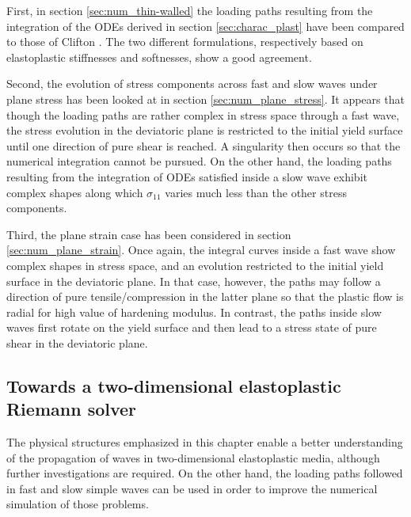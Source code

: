 First, in section \ref{sec:num_thin-walled} the loading paths resulting from the integration of the ODEs derived in section \ref{sec:charac_plast} have been compared to those of Clifton \cite{Clifton}.
The two different formulations, respectively based on elastoplastic stiffnesses and softnesses, show a good agreement.

Second, the evolution of stress components across fast and slow waves under plane stress has been looked at in section \ref{sec:num_plane_stress}.
It appears that though the loading paths are rather complex in stress space through a fast wave, the stress evolution in the deviatoric plane is restricted to the initial yield surface until one direction of pure shear is reached.
A singularity then occurs so that the numerical integration cannot be pursued.
On the other hand, the loading paths resulting from the integration of ODEs satisfied inside a slow wave exhibit complex shapes along which $\sigma_{11}$ varies much less than the other stress components.

Third, the plane strain case has been considered in section \ref{sec:num_plane_strain}.
Once again, the integral curves inside a fast wave show complex shapes in stress space, and an evolution restricted to the initial yield surface in the deviatoric plane.
In that case, however, the paths may follow a direction of pure tensile/compression in the latter plane so that the plastic flow is radial for high value of hardening modulus. 
In contrast, the paths inside slow waves first rotate on the yield surface and then lead to a stress state of pure shear in the deviatoric plane.

\subsection{Towards a two-dimensional elastoplastic Riemann solver}
The physical structures emphasized in this chapter enable a better understanding of the propagation of waves in two-dimensional elastoplastic media, although further investigations are required.
On the other hand, the loading paths followed in fast and slow simple waves can be used in order to improve the numerical simulation of those problems.

